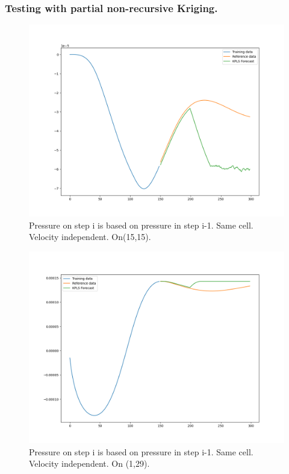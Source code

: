 \documentclass[xcolor=dvipsnames,10pt,aspectratio=169]{beamer}
\begin{document}
\begin{frame}\frametitle{Testing with partial non-recursive Kriging.}
	\begin{minipage}[h!]{0.49\textwidth}
		\begin{figure}
			\centering
			\includegraphics[clip=true, scale=0.25]{figuras/preassure_15_15_krigin_50.png}
	 		\caption{Pressure on step i is based on pressure in step i-1. Same cell. Velocity independent. On(15,15).}
		\end{figure}
	\end{minipage}
	\begin{minipage}[h!]{0.5\textwidth}
		\begin{figure}
			\centering
			\includegraphics[clip=true, scale=0.25]{figuras/preassure_1_29_krigin_50.png}
	 		\caption{Pressure on step i is based on pressure in step i-1. Same cell. Velocity independent. On (1,29).}
		\end{figure}
	\end{minipage}
\end{frame}
\end{document}
